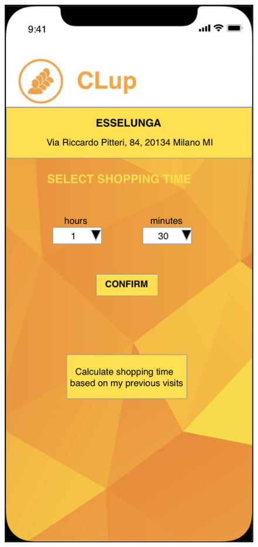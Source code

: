 \documentclass{article}
\begin{document}
\begin{figure}[H]
\begin{minipage}[b]{0.4\textwidth}
\centering
\includegraphics[width=\textwidth]{VisitDuration.png}

\end{minipage}
\end{figure}
\end{document}

